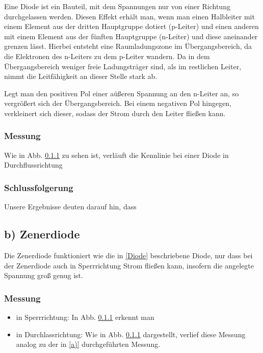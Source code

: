 \documentclass[11pt,a4paper,titlepage, ngerman]{article}
\begin{document}
				Eine Diode ist ein Bauteil, mit dem Spannungen nur von einer Richtung durchgelassen werden. Diesen Effekt erhält man, wenn man einen Halbleiter mit einem Element aus der dritten Hauptgruppe dotiert (p-Leiter) und einen anderen mit einem Element aus der fünften Hauptgruppe (n-Leiter) und diese aneinander grenzen lässt. Hierbei entsteht eine Raumladungszone im Übergangsbereich, da die Elektronen des n-Leiters zu dem p-Leiter wandern. Da in dem Übergangsbereich weniger freie Ladungsträger sind, als im restlichen Leiter, nimmt die Leitfähigkeit an dieser Stelle stark ab.
				
				Legt man den positiven Pol einer aüßeren Spannung an den n-Leiter an, so vergrößert sich der Übergangsbereich. Bei einem negativen Pol hingegen, verkleinert sich dieser, sodass der Strom durch den Leiter fließen kann. 
			
			\subsubsection{Messung}
				
				Wie in Abb. \ref{} zu sehen ist, verläuft die Kennlinie bei einer Diode in Durchflussrichtung %
			
			\subsubsection{Schlussfolgerung}
			
				Unsere Ergebnisse deuten darauf hin, dass %
				
		\subsection{b) Zenerdiode} %
			
			Die Zenerdiode funktioniert wie die in \ref{Diode} beschriebene Diode, nur dass bei der Zenerdiode auch in Sperrrichtung Strom fließen kann, insofern die angelegte Spannung groß genug ist. %
			
			\subsubsection{Messung}
			
				 \begin{itemize}
				 	\item in Sperrrichtung: In Abb. \ref{} erkennt man %
				 	\item in Durchlassrichtung: Wie in Abb. \ref{} dargestellt, verlief diese Messung analog zu der in \ref{a)} durchgeführten Messung.				 	
				\end{itemize}
				
\end{document}
